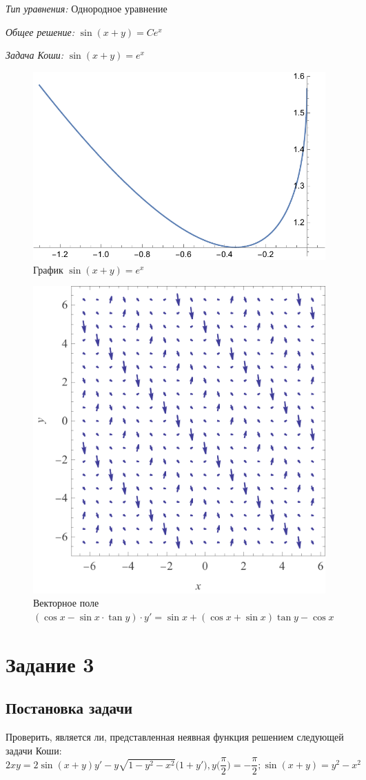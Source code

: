 \documentclass[a4paper, 14pt, titlepage, fleqn]{extarticle}
\begin{document}
\begin{enumerate}
					\textit{Тип уравнения:} Однородное уравнение

					\textit{Общее решение:} \( \sin{(x + y)} = Ce^x \)
	
					\textit{Задача Коши:} \( \sin{(x + y)} = e^x \)

					\begin{figure}[H]
					    	\centering
					    	\includegraphics[width = .5\linewidth]{2.2.pdf}
						\caption[.] {График \(\sin{(x + y)} = e^x \)}
  					\end{figure}

					\begin{figure}[H]
					    	\centering
					    	\includegraphics[width = .5\linewidth]{2.2vf.pdf}
						\caption[.] {Векторное поле \\ \( (\cos{x} - \sin{x} \cdot \tan{y}) \cdot y' = \sin{x} + (\cos{x} + \sin{x})\tan{y} - \cos{x} \)}
  					\end{figure}
			\end{enumerate}

	\pagebreak
	\section*{Задание 3}
		\subsection*{Постановка задачи}
			\noindent Проверить, является ли, представленная неявная функция решением следующей задачи Коши:
			\[2xy = 2\sin{(x+y)}y' - y\sqrt{1-y^2-x^2}\big(1+y'\big) , y\bigg(\dfrac{\pi}{2}\bigg) = -\dfrac{\pi}{2}; \sin{(x+y)} = y^2-x^2 \]
\end{document}
